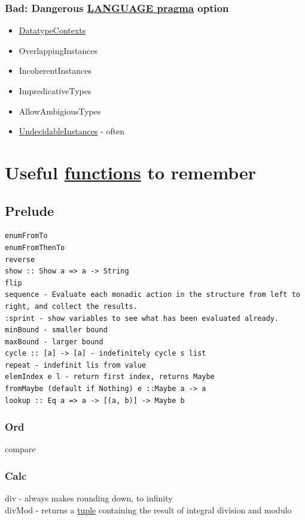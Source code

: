 \documentclass[11pt]{article}
\begin{document}
\subsubsection{Bad: Dangerous \hyperref[org03c5afa]{LANGUAGE pragma} option}
\label{sec:org2f44b7a}

\begin{itemize}
\item \hyperref[orgffd0548]{DatatypeContexts}\\
\item OverlappingInstances\\
\item IncoherentInstances\\
\item ImpredicativeTypes\\
\item AllowAmbigiousTypes\\
\item \hyperref[orga6dfaea]{UndecidableInstances} - often\\
\end{itemize}

\section{Useful \hyperref[org66c5288]{functions} to remember}
\label{sec:org5c680a2}

\subsection{Prelude}
\label{sec:org24b677c}
\begin{verbatim}
enumFromTo
enumFromThenTo
reverse
show :: Show a => a -> String
flip
sequence - Evaluate each monadic action in the structure from left to right, and collect the results.
:sprint - show variables to see what has been evaluated already.
minBound - smaller bound
maxBound - larger bound
cycle :: [a] -> [a] - indefinitely cycle s list
repeat - indefinit lis from value
elemIndex e l - return first index, returns Maybe
fromMaybe (default if Nothing) e ::Maybe a -> a
lookup :: Eq a => a -> [(a, b)] -> Maybe b
\end{verbatim}

\subsubsection{Ord}
\label{sec:org6b80226}
compare\\

\subsubsection{Calc}
\label{sec:org84d56fc}
div - always makes rounding down, to infinity\\
divMod - returns a \hyperref[org7c37a79]{tuple} containing the result of integral division and modulo\\
\end{document}
